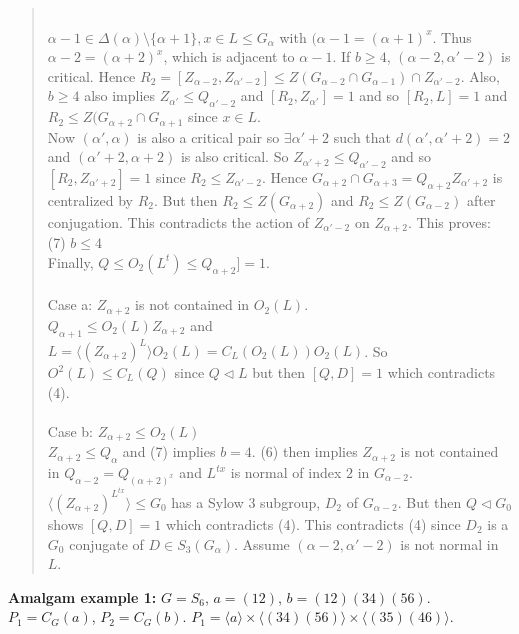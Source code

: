 \begin{quote}
\\
$\alpha - 1 \in \Delta(\alpha) \setminus \{ \alpha + 1 \}, x \in L \leq G_{\alpha}$ with $(\alpha - 1 = (\alpha + 1)^x$.  Thus
$\alpha - 2 = (\alpha + 2)^x$, which is adjacent to $\alpha - 1$.  If $b \geq 4$, $(\alpha - 2, \alpha' - 2)$ is critical.  Hence
$R_2= [Z_{\alpha - 2}, Z_{\alpha' - 2}] \leq Z(G_{\alpha - 2} \cap G_{\alpha - 1}) \cap Z_{\alpha' - 2}$.  Also,
$b \geq 4$ also implies $Z_{\alpha'} \leq Q_{\alpha' - 2}$ and $[R_2, Z_{\alpha'}] = 1$ and so $[R_2 , L] = 1$ and
$R_2 \leq Z(G_{\alpha + 2} \cap G_{\alpha + 1}$ since $x \in L$.\\
Now $(\alpha', \alpha)$ is also a critical pair so $\exists \alpha' +2$ such that $d(\alpha', \alpha' + 2) = 2$ and
$(\alpha' +2, \alpha + 2)$ is also critical. So $Z_{\alpha' + 2} \leq Q_{\alpha' - 2}$ and so
$[R_2, Z_{\alpha' +2}] = 1$ since $R_2 \leq Z_{\alpha' - 2}$.  Hence $G_{\alpha + 2} \cap G_{\alpha + 3} = Q_{\alpha +2}Z_{\alpha'+2}$
is centralized by $R_2$.  But then $R_2 \leq Z(G_{\alpha + 2})$ and  $R_2 \leq Z(G_{\alpha - 2})$ after conjugation.  This contradicts
the action of $Z_{\alpha' - 2}$ on  $Z_{\alpha + 2}$.
This proves:\\
(7) $b \leq 4$
\\
Finally, $Q \leq O_2(L^t) \leq Q_{\alpha +2}] =  1$.\\
\\
Case a: $Z_{\alpha + 2}$ is not contained in $O_2(L)$.\\
$Q_{\alpha + 1} \leq O_2(L) Z_{\alpha + 2}$ and $L= \langle (Z_{\alpha + 2})^L \rangle O_2(L) = C_L(O_2(L)) O_2(L)$.
So $O^2(L) \leq C_L(Q)$ since $Q \lhd L$ but then $[Q, D] = 1$ which contradicts (4).
\\
\\
Case b: $Z_{\alpha + 2} \leq O_2(L)$
\\
$Z_{\alpha + 2} \leq Q_{\alpha}$ and (7) implies $b=4$.  (6) then implies
$Z_{\alpha + 2}$ is not contained in $Q_{\alpha - 2}= Q_{(\alpha + 2)^x}$ and $L^{tx}$ is normal of index $2$ in $G_{\alpha - 2}$.
$\langle (Z_{\alpha + 2})^{L^{tx}} \rangle \leq G_0$ has a Sylow $3$ subgroup, $D_2$ of $G_{\alpha - 2}$. But then
$Q \lhd G_0$ shows $[Q, D] = 1$ which contradicts (4).
This contradicts (4) since $D_2$ is a $G_0$ conjugate of $D \in S_3(G_{\alpha})$.
Assume $(\alpha - 2, \alpha' - 2)$ is not normal in $L$.
\end{quote}
{\bf Amalgam example 1:} $G= S_6$, $a=(12)$, $b=(12)(34)(56)$.  $P_1 = C_G(a)$, $P_2 = C_G(b)$.  
$P_1 = \langle a \rangle \times \langle (34)(56) \rangle \times \langle (35)(46) \rangle$.
